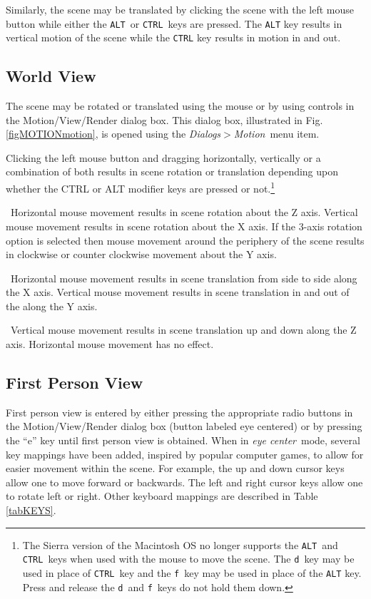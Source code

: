 \documentclass[11pt,twoside]{book}
\newcommand{\parma}{.75}
\newcommand{\parmb}{.5}
\newcommand{\parmc}{0.25}
\newcommand{\blist}{
\begin{list}
{}{
\setlength{\leftmargin}{\parma in}
\setlength{\labelwidth}{\parmb in}
\setlength{\labelsep}{\parmc in}
\setlength{\listparindent}{0.3in}
\setlength{\topsep}{.3in}
\setlength{\parsep}{.0in}
}}
\newcommand{\elist}{\end{list}}
\newcommand{\hitem}[1]{\item[{\bf #1} \hfill]}
\begin{document}
Similarly, the scene may be translated by clicking the scene with the left mouse button while either the {\tt ALT}\ or {\tt CTRL}\ keys are pressed.
The {\tt ALT} key results in vertical motion of the scene while the {\tt CTRL} key results in motion in and out.

\subsection{World View}

The scene may be rotated or translated using the mouse or
by using controls in the Motion/View/Render dialog box.
This dialog box, illustrated in Fig. \ref{figMOTIONmotion}, is opened
using the {\em Dialogs$>$Motion}\ menu item.

Clicking the left mouse button and dragging horizontally,
vertically or a combination of both results in scene rotation or
translation depending upon whether the CTRL or ALT modifier keys
are pressed or not.\footnote{The Sierra version of the Macintosh OS no longer supports
the {\tt ALT}\ and {\tt CTRL}\ keys when used with the mouse to move the scene.
The {\tt d}\ key may be used
in place of {\tt CTRL}\ key and the {\tt f}\ key may be used in place of the {\tt ALT} key.
Press and release the {\tt d}\ and {\tt f}\ keys do not hold them down.
}

\blist

\hitem{no modifier keys}\ Horizontal mouse movement results in
scene rotation about the Z axis. Vertical mouse movement results
in scene rotation about the X axis.  If the 3-axis rotation option
is selected then mouse movement around the periphery of the scene
results in clockwise or counter clockwise movement about the Y
axis.

\hitem{CTRL key depressed}\ Horizontal mouse movement results in
scene translation from side to side along the X axis. Vertical
mouse movement results in scene translation in and out of the
along the Y axis.

\hitem{ALT key depressed}\ Vertical mouse movement results in scene
translation up and down along the Z axis. Horizontal mouse
movement has no effect.

\elist

\subsection{First Person View}
\label{section:eyeview}
First person view is entered by either pressing the appropriate
radio buttons in the Motion/View/Render dialog box (button
labeled eye centered) or by pressing the ``e'' key until first
person view is obtained. When in {\em eye center}\ mode, several
key mappings have been added, inspired by popular computer games,
to allow for easier movement within the scene. For example, the up
and down cursor keys allow one to move forward or backwards.  The
left and right cursor keys allow one to rotate left or right.
Other keyboard mappings are described in Table \ref{tabKEYS}.
\end{document}
